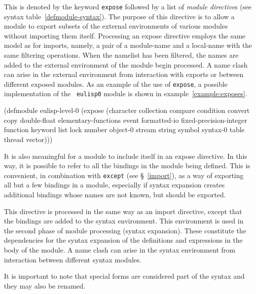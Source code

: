 %
\begin{optDefinition}
This is denoted by the keyword {\tt expose} followed by a list of {\em module
    directive\/}s (see syntax table~\ref{defmodule-syntax}).  The purpose of this
directive is to allow a module to export subsets of the external environments of
various modules without importing them itself.  Processing an expose directive
employs the same model as for imports, namely, a pair of a module-name and a
local-name with the same filtering operations.  When the namelist has been
filtered, the names are added to the external environment of the module begin
processed.  A name clash can arise in the external environment from interaction
with exports or between different exposed modules.  As an example of the use of
{\tt expose}, a possible implementation of the {\tt
    eulisp0} module is shown in
example~\ref{example:exposes}.
%
\begin{example}
\label{example:exposes}
{\small%
\syntax
(defmodule eulisp-level-0
  (expose
    (character collection compare condition convert copy
     double-float elementary-functions event
     formatted-io fixed-precision-integer function
     keyword list lock number object-0 stream string
     symbol syntax-0 table thread vector)))
\endsyntax
}
\end{example}
%
It is also meaningful for a module to include itself in an expose
directive.  In this way, it is possible to refer to all the bindings
in the module being defined.  This is convenient, in combination with
{\tt except} (see \S~\ref{import}), as a way of exporting all but
a few bindings in a module, especially if syntax expansion creates
additional bindings whose names are not known, but should be exported.
\end{optDefinition}
%
\label{syntax-directive}
\begin{optDefinition}
This directive is processed in the same way as an import directive,
except that the bindings are added to the syntax environment.  This
environment is used in the second phase of module processing (syntax
expansion).  These constitute the dependencies for the syntax expansion
of the definitions and expressions in the body of the module.  A name
clash can arise in the syntax environment from interaction between
different syntax modules.

It is important to note that special forms are considered part of the
syntax and they may also be renamed.
\end{optDefinition}

